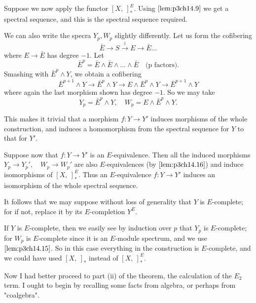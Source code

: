 \documentclass[../main]{subfiles}
\begin{document}
\par Suppose we now apply the functor $[X,~]_\ast^E$. Using $\ref{lem:p3ch14.9}$ we get a spectral sequence, and this is the spectral sequence required.

We can also write the specra $Y_p, W_p$ slightly differently. Let us form the cofibering
$$\bar{E}\longrightarrow S \overset{i}{\longrightarrow}E\longrightarrow\bar{E}\hdots$$
where $E\longrightarrow\bar{E}$ has degree $-1$. Let
$$\bar{E}^p=\bar{E}\wedge\bar{E}\wedge\hdots\wedge\bar{E} \quad \text{(p factors).}$$
Smashing with $\bar{E}^p\wedge Y$, we obtain a cofibering
$$\bar{E}^{p+1}\wedge Y\longrightarrow \bar{E}^p\wedge Y \longrightarrow E\wedge \bar{E}^p\wedge Y \longrightarrow \bar{E}^{p+1}\wedge Y$$
where again the last morphism shown has degree $-1$. So we may take 
$$Y_p=\bar{E}^p\wedge Y, \quad W_p=E\wedge\bar{E}^p\wedge Y.$$

This makes it trivial that a morphism $f:Y\longrightarrow Y'$ induces morphisms of the whole construction, and induces a homomorphism from the spectral sequence for $Y$ to that for $Y'$.

Suppose now that $f:Y\longrightarrow Y'$ is an $E$-equivalence. Then all the induced morphisms $Y_p\longrightarrow Y_p',\quad W_p\longrightarrow W_p'$ are also $E$-equivalences (by $\ref{lem:p3ch14.16}$) and induce isomorphisms of $[X,~]_\ast^E$. Thus an $E$-equivalence $f:Y\longrightarrow Y'$ induces an isomorphism of the whole spectral sequence.

It follows that we may suppose without loss of generality that $Y$ is $E$-complete; for if not, replace it by its $E$-completion $Y^E$.

If $Y$ is $E$-complete, then we easily see by induction over $p$ that $Y_p$ is $E$-complete; for $W_p$ is $E$-complete since it is an $E$-module spectrum, and we use $\ref{lem:p3ch14.15}$. So in this case everything in the construction is $E$-complete, and we could have used $[X,~]_\ast$ instead of $[X,~]_\ast^E$.

\par Now I had better proceed to part (ii) of the theorem, the calculation of the $E_2$ term. I ought to begin by recalling some facts from algebra, or perhaps from "coalgebra".
\end{document}
